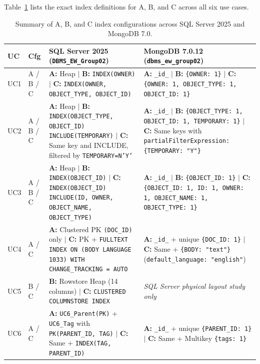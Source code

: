 Table~\ref{tab:abc-configs} lists the exact index definitions for A, B, and C across all six use cases.

\begin{table}[H]
\centering\footnotesize
\caption{Summary of A, B, and C index configurations across SQL Server 2025 and MongoDB 7.0.}
\label{tab:abc-configs}
\begin{tabularx}{\linewidth}{@{}l l >{\raggedright\arraybackslash}X >{\raggedright\arraybackslash}X@{}}
\toprule
UC & Cfg & SQL Server 2025 (\texttt{DBMS\_EW\_Group02}) & MongoDB 7.0.12 (\texttt{dbms\_ew\_group02})\\
\midrule
UC1 & A / B / C & \textbf{A:} Heap $\mid$ \textbf{B:} \texttt{INDEX(OWNER)} $\mid$ \textbf{C:} \texttt{INDEX(OWNER, OBJECT\_TYPE, OBJECT\_ID)} & \textbf{A:} \texttt{\_id\_} $\mid$ \textbf{B:} \texttt{\{OWNER: 1\}} $\mid$ \textbf{C:} \texttt{\{OWNER: 1, OBJECT\_TYPE: 1, OBJECT\_ID: 1\}}\\
UC2 & A / B / C & \textbf{A:} Heap $\mid$ \textbf{B:} \texttt{INDEX(OBJECT\_TYPE, OBJECT\_ID) INCLUDE(TEMPORARY)} $\mid$ \textbf{C:} Same key and INCLUDE, filtered by \texttt{TEMPORARY=N'Y'} & \textbf{A:} \texttt{\_id\_} $\mid$ \textbf{B:} \texttt{\{OBJECT\_TYPE: 1, OBJECT\_ID: 1, TEMPORARY: 1\}} $\mid$ \textbf{C:} Same keys with \texttt{partialFilterExpression: \{TEMPORARY: "Y"\}}\\
UC3 & A / B / C & \textbf{A:} Heap $\mid$ \textbf{B:} \texttt{INDEX(OBJECT\_ID)} $\mid$ \textbf{C:} \texttt{INDEX(OBJECT\_ID) INCLUDE(ID, OWNER, OBJECT\_NAME, OBJECT\_TYPE)} & \textbf{A:} \texttt{\_id\_} $\mid$ \textbf{B:} \texttt{\{OBJECT\_ID: 1\}} $\mid$ \textbf{C:} \texttt{\{OBJECT\_ID: 1, ID: 1, OWNER: 1, OBJECT\_NAME: 1, OBJECT\_TYPE: 1\}}\\
UC4 & A / C & \textbf{A:} Clustered PK \texttt{(DOC\_ID)} only $\mid$ \textbf{C:} PK + \texttt{FULLTEXT INDEX ON (BODY LANGUAGE 1033) WITH CHANGE\_TRACKING = AUTO} & \textbf{A:} \texttt{\_id\_} + unique \texttt{\{DOC\_ID: 1\}} $\mid$ \textbf{C:} Same + \texttt{\{BODY: "text"\}} (\texttt{default\_language: "english"})\\
UC5 & B / C & \textbf{B:} Rowstore Heap (14 columns) $\mid$ \textbf{C:} \texttt{CLUSTERED COLUMNSTORE INDEX} & \emph{SQL Server physical layout study only}\\
UC6 & A / C & \textbf{A:} \texttt{UC6\_Parent(PK)} + \texttt{UC6\_Tag} with \texttt{PK(PARENT\_ID, TAG)} $\mid$ \textbf{C:} Same + \texttt{INDEX(TAG, PARENT\_ID)} & \textbf{A:} \texttt{\_id\_} + unique \texttt{\{PARENT\_ID: 1\}} $\mid$ \textbf{C:} Same + Multikey \texttt{\{tags: 1\}}\\
\bottomrule
\end{tabularx}
\end{table}

